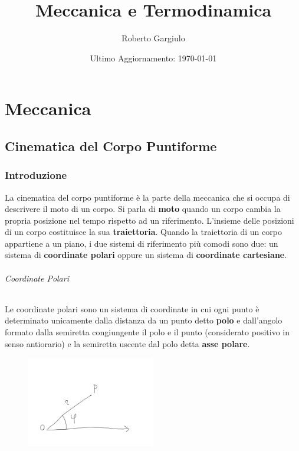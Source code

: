 \documentclass{report}
\title{Meccanica e Termodinamica}
\author{Roberto Gargiulo}
\date{Ultimo Aggiornamento: \today}
\begin{document}
\maketitle
\tableofcontents

\part{Meccanica}
\chapter{Cinematica del Corpo Puntiforme}
\section{Introduzione}
La cinematica del corpo puntiforme è la parte della meccanica che si occupa di descrivere il moto di un corpo. Si parla di \textbf{moto} quando un corpo cambia la propria posizione nel tempo rispetto ad un riferimento. L'insieme delle posizioni di un corpo costituisce la sua \textbf{traiettoria}. Quando la traiettoria di un corpo appartiene a un piano, i due sistemi di riferimento più comodi sono due: un sistema di \textbf{coordinate polari} oppure un sistema di \textbf{coordinate cartesiane}.
\paragraph{Coordinate Polari}
Le coordinate polari sono un sistema di coordinate in cui ogni punto è determinato unicamente dalla distanza da un punto detto \textbf{polo} e dall'angolo formato dalla semiretta congiungente il polo e il punto (considerato positivo in senso antiorario) e la semiretta uscente dal polo detta \textbf{asse polare}.
\begin{figure}[H]
    \centering
    \includegraphics[width=0.5\textwidth]{CoordPolari.png}
\end{figure}
\end{document}
